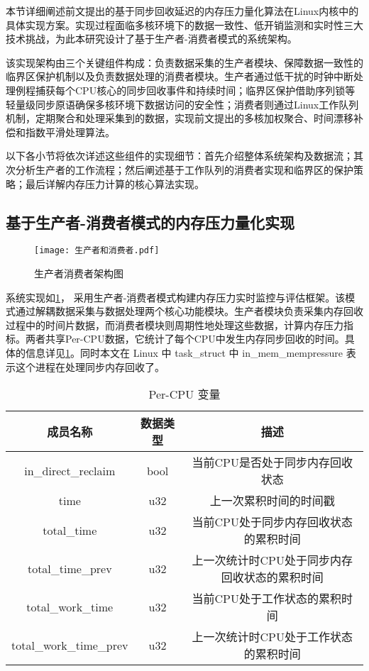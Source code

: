 本节详细阐述前文提出的基于同步回收延迟的内存压力量化算法在Linux内核中的具体实现方案。实现过程面临多核环境下的数据一致性、低开销监测和实时性三大技术挑战，为此本研究设计了基于生产者-消费者模式的系统架构。

该实现架构由三个关键组件构成：负责数据采集的生产者模块、保障数据一致性的临界区保护机制以及负责数据处理的消费者模块。生产者通过低干扰的时钟中断处理例程捕获每个CPU核心的同步回收事件和持续时间；临界区保护借助序列锁等轻量级同步原语确保多核环境下数据访问的安全性；消费者则通过Linux工作队列机制，定期聚合和处理采集到的数据，实现前文提出的多核加权聚合、时间漂移补偿和指数平滑处理算法。

以下各小节将依次详述这些组件的实现细节：首先介绍整体系统架构及数据流；其次分析生产者的工作流程；然后阐述基于工作队列的消费者实现和临界区的保护策略；最后详解内存压力计算的核心算法实现。

\subsection{基于生产者-消费者模式的内存压力量化实现}

\begin{figure}[H]
    \centering
    \texttt{[image: 生产者和消费者.pdf]}
    \caption{生产者消费者架构图}
    \label{fig:producer-consumer}
\end{figure}

系统实现如\ref{fig:producer-consumer}， 采用生产者-消费者模式构建内存压力实时监控与评估框架。该模式通过解耦数据采集与数据处理两个核心功能模块。生产者模块负责采集内存回收过程中的时间片数据，而消费者模块则周期性地处理这些数据，计算内存压力指标。两者共享Per-CPU数据，它统计了每个CPU中发生内存同步回收的时间。具体的信息详见\ref{tab:sensor_data}。同时本文在 Linux 中 task\_struct 中 in\_mem\_mempressure 表示这个进程在处理同步内存回收了。

\begin{table}[htbp]
    \centering
    \caption{Per-CPU 变量}
    \label{tab:sensor_data}
    \begin{tabular}{ccc}
        \toprule
        成员名称& 数据类型     & 描述                                        \\ \midrule
        in\_direct\_reclaim & bool & 当前CPU是否处于同步内存回收状态\\
        \midrule
        time & u32 & 上一次累积时间的时间戳\\
        \midrule
        total\_time &u32&当前CPU处于同步内存回收状态的累积时间\\
        \midrule
        total\_time\_prev&u32&上一次统计时CPU处于同步内存回收状态的累积时间\\
        \midrule
        total\_work\_time&u32&当前CPU处于工作状态的累积时间\\
        \midrule
        total\_work\_time\_prev&u32&上一次统计时CPU处于工作状态的累积时间\\
        \bottomrule
    \end{tabular}
  \end{table}

